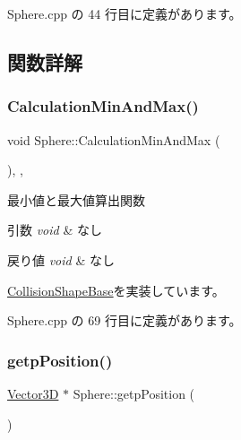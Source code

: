  Sphere.\+cpp の 44 行目に定義があります。



\subsection{関数詳解}
\mbox{\label{class_sphere_a651b659cec38a3a93a4be589f25899d7}} 
\subsubsection{\texorpdfstring{Calculation\+Min\+And\+Max()}{CalculationMinAndMax()}}
{\footnotesize\ttfamily void Sphere\+::\+Calculation\+Min\+And\+Max (\begin{DoxyParamCaption}{ }\end{DoxyParamCaption})\hspace{0.3cm}{\ttfamily [override]}, {\ttfamily [private]}, {\ttfamily [virtual]}}



最小値と最大値算出関数 


\begin{DoxyParams}{引数}
{\em void} & なし \\
\hline
\end{DoxyParams}

\begin{DoxyRetVals}{戻り値}
{\em void} & なし \\
\hline
\end{DoxyRetVals}


\mbox{\hyperlink{class_collision_shape_base_ad227c2f83038d7c05bc6b1d510cb4000}{Collision\+Shape\+Base}}を実装しています。



 Sphere.\+cpp の 69 行目に定義があります。

\mbox{\label{class_sphere_ad1885bd0628ecd509ea2a61918875bd1}} 
\subsubsection{\texorpdfstring{getp\+Position()}{getpPosition()}}
{\footnotesize\ttfamily \mbox{\hyperlink{class_vector3_d}{Vector3D}} $\ast$ Sphere\+::getp\+Position (\begin{DoxyParamCaption}{ }\end{DoxyParamCaption})}



